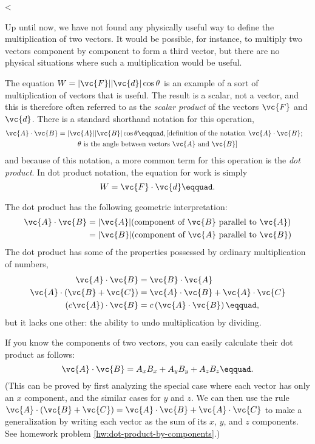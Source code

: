 <%

Up until now, we have not found any physically useful way to
define the multiplication of two vectors. It would be
possible, for instance, to multiply two vectors component by
component to form a third vector, but there are no physical
situations where such a multiplication would be useful.

The equation $W= |\vc{F}| |\vc{d}| \cos \theta$ is an example of
a sort of multiplication of vectors that is useful. The
result is a scalar, not a vector, and this is therefore
often referred to as the \emph{scalar product} of the
vectors $\vc{F}$ and $\vc{d}$. There is a standard shorthand
notation for this operation,
\begin{multline*}
 \vc{A}\cdot\vc{B} = |\vc{A}| |\vc{B}| \cos \theta\eqquad,
    \hfill \shoveright{\text{[definition of the notation $\vc{A}\cdot\vc{B}$;}}\\
    \text{$\theta$ is the angle between vectors $\vc{A}$ and $\vc{B}$]}
\end{multline*}
and because of this notation, a more common term for this
operation is the \emph{dot product}. In dot product
notation, the equation for work is simply
\begin{equation*}
  W = \vc{F}\cdot\vc{d}\eqquad.
\end{equation*}

 The dot product has the following geometric interpretation:
\begin{align*}
\vc{A}\cdot\vc{B} &= |\vc{A}|  (\text{component of $\vc{B}$ parallel to $\vc{A}$}) \\
 &= |\vc{B}|  (\text{component of $\vc{A}$ parallel to $\vc{B}$})
\end{align*}
The dot product has some of the properties possessed by
ordinary multiplication of numbers,
\begin{align*}
\vc{A}\cdot\vc{B} &= \vc{B}\cdot\vc{A} \\
\vc{A}\cdot(\vc{B}+\vc{C}) &= \vc{A}\cdot\vc{B}+\vc{A}\cdot\vc{C} \\
\left(c\vc{A}\right)\cdot\vc{B} &= c\left(\vc{A}\cdot\vc{B}\right)\eqquad,
\end{align*}
but it lacks one other: the ability to undo multiplication by dividing.

If you know the components of two vectors, you can easily
calculate their dot product as follows:
\begin{equation*}
  \vc{A}\cdot\vc{B} = A_xB_x+A_yB_y+A_zB_z\eqquad.
\end{equation*}
(This can be proved by first analyzing the special case where
each vector has only an $x$ component, and the similar cases
for $y$ and $z$. We can then use the rule 
$\vc{A}\cdot(\vc{B}+\vc{C}) = \vc{A}\cdot\vc{B}+\vc{A}\cdot\vc{C}$
to make a generalization
by writing each vector as the sum of its $x$, $y$, and $z$ components.
See homework problem \ref{hw:dot-product-by-components}.)
\label{dot-product-by-components}

